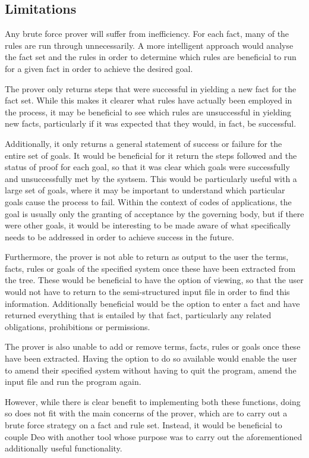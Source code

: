 \documentclass{l4proj}
\begin{document}
\subsection{Limitations}
Any brute force prover will suffer from inefficiency. For each fact, many of the rules are run through unnecessarily. A more intelligent approach would analyse the fact set and the rules in order to determine which rules are beneficial to run for a given fact in order to achieve the desired goal. 

The prover only returns steps that were successful in yielding a new fact for the fact set. While this makes it clearer what rules have actually been employed in the process, it may be beneficial to see which rules are unsuccessful in yielding new facts, particularly if it was expected that they would, in fact, be successful. 

Additionally, it only returns a general statement of success or failure for the entire set of goals. It would be beneficial for it return the steps followed and the status of proof for each goal, so that it was clear which goals were successfully and unsuccessfully met by the systsem. This would be particularly useful with a large set of goals, where it may be important to understand which particular goals cause the process to fail. Within the context of codes of applications, the goal is usually only the granting of acceptance by the governing body, but if there were other goals, it would be interesting to be made aware of what specifically needs to be addressed in order to achieve success in the future. 

Furthermore, the prover is not able to return as output to the user the terms, facts, rules or goals of the specified system once these have been extracted from the tree. These would be beneficial to have the option of viewing, so that the user would not have to return to the semi-structured input file in order to find this information. Additionally beneficial would be the option to enter a fact and have returned everything that is entailed by that fact, particularly any related obligations, prohibitions or permissions. 

The prover is also unable to add or remove terms, facts, rules or goals once these have been extracted. Having the option to do so available would enable the user to amend their specified system without having to quit the program, amend the input file and run the program again. 

However, while there is clear benefit to implementing both these functions, doing so does not fit with the main concerns of the prover, which are to carry out a brute force strategy on a fact and rule set. Instead, it would be beneficial to couple Deo with another tool whose purpose was to carry out the aforementioned additionally useful functionality. 
\end{document}

